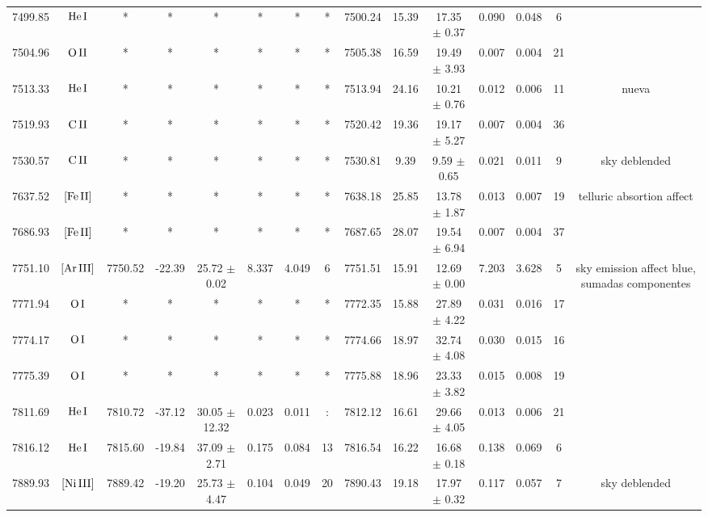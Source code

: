 \documentclass{article}
\begin{document}
\begin{table*}
\begin{adjustbox}{width=\textwidth}
\begin{tabular}{ccccccccccccccc}
7499.85 & $\mbox{He}\thinspace \mbox{I}$ & * & * & * & * & * & * & 7500.24 & 15.39 & 17.35 $\pm$ 0.37 & 0.090 & 0.048 & 6 &  \\
7504.96 & $\mbox{O}\thinspace \mbox{II}$ & * & * & * & * & * & * & 7505.38 & 16.59 & 19.49 $\pm$ 3.93 & 0.007 & 0.004 & 21 &  \\
7513.33 & $\mbox{He}\thinspace \mbox{I}$ & * & * & * & * & * & * & 7513.94 & 24.16 & 10.21 $\pm$ 0.76 & 0.012 & 0.006 & 11 &  nueva \\
7519.93 & $\mbox{C}\thinspace \mbox{II}$ & * & * & * & * & * & * & 7520.42 & 19.36 & 19.17 $\pm$ 5.27 & 0.007 & 0.004 & 36 &  \\
7530.57 & $\mbox{C}\thinspace \mbox{II}$ & * & * & * & * & * & * & 7530.81 & 9.39 & 9.59 $\pm$ 0.65 & 0.021 & 0.011 & 9 &  sky deblended \\
7637.52 & $\mbox{[Fe}\thinspace \mbox{II]}$ & * & * & * & * & * & * & 7638.18 & 25.85 & 13.78 $\pm$ 1.87 & 0.013 & 0.007 & 19 &  telluric absortion affect \\
7686.93 & $\mbox{[Fe}\thinspace \mbox{II]}$ & * & * & * & * & * & * & 7687.65 & 28.07 & 19.54 $\pm$ 6.94 & 0.007 & 0.004 & 37 &  \\
7751.10 & $\mbox{[Ar}\thinspace \mbox{III]}$ & 7750.52 & -22.39 & 25.72 $\pm$ 0.02 & 8.337 & 4.049 & 6 & 7751.51 & 15.91 & 12.69 $\pm$ 0.00 & 7.203 & 3.628 & 5 &  sky emission affect blue, sumadas componentes \\
7771.94 & $\mbox{O}\thinspace \mbox{I}$ & * & * & * & * & * & * & 7772.35 & 15.88 & 27.89 $\pm$ 4.22 & 0.031 & 0.016 & 17 &   \\
7774.17 & $\mbox{O}\thinspace \mbox{I}$ & * & * & * & * & * & * & 7774.66 & 18.97 & 32.74 $\pm$ 4.08 & 0.030 & 0.015 & 16 &   \\
7775.39 & $\mbox{O}\thinspace \mbox{I}$ & * & * & * & * & * & * & 7775.88 & 18.96 & 23.33 $\pm$ 3.82 & 0.015 & 0.008 & 19 &   \\
7811.69 & $\mbox{He}\thinspace \mbox{I}$ & 7810.72 & -37.12 & 30.05 $\pm$ 12.32 & 0.023 & 0.011 & : & 7812.12 & 16.61 & 29.66 $\pm$ 4.05 & 0.013 & 0.006 & 21 &  \\
7816.12 & $\mbox{He}\thinspace \mbox{I}$ & 7815.60 & -19.84 & 37.09 $\pm$ 2.71 & 0.175 & 0.084 & 13 & 7816.54 & 16.22 & 16.68 $\pm$ 0.18 & 0.138 & 0.069 & 6 &  \\
7889.93 & $\mbox{[Ni}\thinspace \mbox{III]}$ & 7889.42 & -19.20 & 25.73 $\pm$ 4.47 & 0.104 & 0.049 & 20 & 7890.43 & 19.18 & 17.97 $\pm$ 0.32 & 0.117 & 0.057 & 7 &  sky deblended \\

\end{tabular}
\end{adjustbox}
\end{table*}
\end{document}
